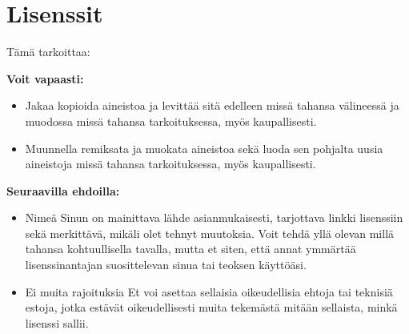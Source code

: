 
\pagestyle{empty}
\chapter*{Lisenssit}

Tämä tarkoittaa:

\textbf{Voit vapaasti:}
\begin{itemize}
\item Jakaa \textemdash kopioida aineistoa ja levittää sitä edelleen missä tahansa välineessä ja muodossa missä tahansa tarkoituksessa, myös kaupallisesti.
\item Muunnella \textemdash remiksata ja muokata aineistoa sekä luoda sen pohjalta uusia aineistoja missä tahansa tarkoituksessa, myös kaupallisesti.
\end{itemize}

\textbf{Seuraavilla ehdoilla:}
\begin{itemize}
\item Nimeä \textemdash Sinun on mainittava lähde asianmukaisesti, tarjottava linkki lisenssiin sekä merkittävä, mikäli olet tehnyt muutoksia. Voit tehdä yllä olevan millä tahansa kohtuullisella tavalla, mutta et siten, että annat ymmärtää lisenssinantajan suosittelevan sinua tai teoksen käyttöäsi.
\item Ei muita rajoituksia \textemdash Et voi asettaa sellaisia oikeudellisia ehtoja tai teknisiä estoja, jotka estävät oikeudellisesti muita tekemästä mitään sellaista, minkä lisenssi sallii.
\end{itemize}


\clearpage
